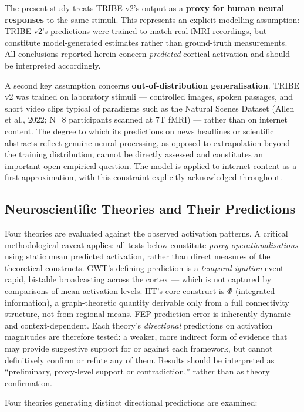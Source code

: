 \documentclass[11pt,letterpaper]{article}
\numberwithin{equation}{section}
\begin{document}
The present study treats TRIBE v2's output as a \textbf{proxy for human neural responses} to the same stimuli. This represents an explicit modelling assumption: TRIBE v2's predictions were trained to match real fMRI recordings, but constitute model-generated estimates rather than ground-truth measurements. All conclusions reported herein concern \textit{predicted} cortical activation and should be interpreted accordingly.

A second key assumption concerns \textbf{out-of-distribution generalisation}. TRIBE v2 was trained on laboratory stimuli --- controlled images, spoken passages, and short video clips typical of paradigms such as the Natural Scenes Dataset (Allen et al., 2022; N=8 participants scanned at 7T fMRI) --- rather than on internet content. The degree to which its predictions on news headlines or scientific abstracts reflect genuine neural processing, as opposed to extrapolation beyond the training distribution, cannot be directly assessed and constitutes an important open empirical question. The model is applied to internet content as a first approximation, with this constraint explicitly acknowledged throughout.

\subsection{Neuroscientific Theories and Their Predictions}

Four theories are evaluated against the observed activation patterns. A critical methodological caveat applies: all tests below constitute \emph{proxy operationalisations} using static mean predicted activation, rather than direct measures of the theoretical constructs. GWT's defining prediction is a \emph{temporal ignition} event --- rapid, bistable broadcasting across the cortex --- which is not captured by comparisons of mean activation levels. IIT's core construct is $\Phi$ (integrated information), a graph-theoretic quantity derivable only from a full connectivity structure, not from regional means. FEP prediction error is inherently dynamic and context-dependent. Each theory's \emph{directional} predictions on activation magnitudes are therefore tested: a weaker, more indirect form of evidence that may provide suggestive support for or against each framework, but cannot definitively confirm or refute any of them. Results should be interpreted as ``preliminary, proxy-level support or contradiction,'' rather than as theory confirmation.

Four theories generating distinct directional predictions are examined:
\end{document}
